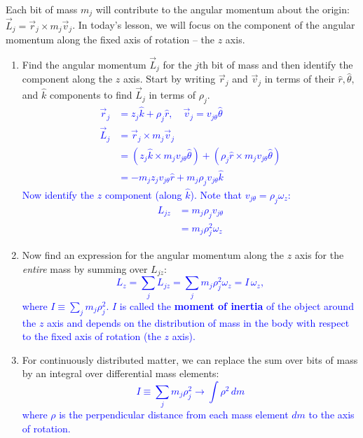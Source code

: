 \documentclass[11pt, letterpaper, openany]{book}
\newenvironment{exercise}[1][Exercise]{%
  \tcolorbox[blanker, breakable, left=1em,
    before skip=1em, after skip=1em,
    borderline west={3pt}{0pt}{PhysNavy},
    colback=PhysCream,
    before upper={\textcolor{PhysNavy}{\sffamily\bfseries #1:}\space}
  ]%
}{%
  \endtcolorbox%
}
\begin{document}
Each bit of mass $m_j$ will contribute to the angular momentum about the origin: $\vec{L}_j = \vec{r}_j \times m_j\vec{v}_j$. In today's lesson, we will focus on the component of the angular momentum along the fixed axis of rotation -- the $z$ axis.

\begin{exercise}[Exercise 3]
\begin{enumerate}[label=(\alph*)]
    \item Find the angular momentum $\vec{L}_j$ for the $j$th bit of mass and then identify the component along the $z$ axis. Start by writing $\vec{r}_j$ and $\vec{v}_j$ in terms of their $\hat{r}, \hat{\theta},$ and $\hat{k}$ components to find $\vec{L}_j$ in terms of $\rho_j$. \\
    \textcolor{blue}{
    \begin{align*}
        \vec{r}_j &= z_j\hat{k} + \rho_j\hat{r}, \quad \vec{v}_j = v_{j\theta}\hat{\theta} \\
        \vec{L}_j &= \vec{r}_j \times m_j\vec{v}_j \\
        &= (z_j\hat{k} \times m_j v_{j\theta}\hat{\theta}) + (\rho_j\hat{r} \times m_j v_{j\theta}\hat{\theta}) \\
        &= -m_j z_j v_{j\theta}\hat{r} + m_j \rho_j v_{j\theta}\hat{k}
    \end{align*}
    Now identify the $z$ component (along $\hat{k}$). Note that $v_{j\theta} = \rho_j\omega_z$:
    \begin{align*}
        L_{jz} &= m_j \rho_j v_{j\theta} \\
        &= m_j \rho_j^2 \omega_z
    \end{align*}
    }
    
    \item Now find an expression for the angular momentum along the $z$ axis for the \textit{entire} mass by summing over $L_{jz}$: \\
    \textcolor{blue}{
    \[ L_z = \sum_j L_{jz} = \sum_j m_j \rho_j^2 \omega_z = I\,\omega_z, \]
    where $I \equiv \sum_j m_j \rho_j^2$. $I$ is called the \textbf{moment of inertia} of the object around the $z$ axis and depends on the distribution of mass in the body with respect to the fixed axis of rotation (the $z$ axis).
    }
    
    \item For continuously distributed matter, we can replace the sum over bits of mass by an integral over differential mass elements: \\
    \textcolor{blue}{
    \[ I \equiv \sum_j m_j \rho_j^2 \to \int \rho^2\,dm \]
    where $\rho$ is the perpendicular distance from each mass element $dm$ to the axis of rotation.
    }
\end{enumerate}


\end{exercise}
\end{document}

